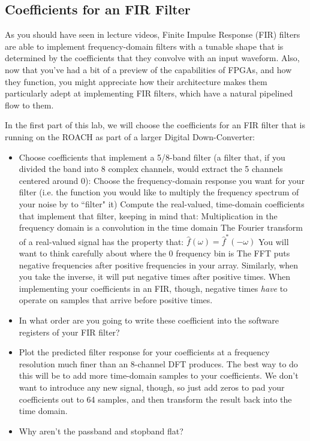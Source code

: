 \documentclass[11pt]{article}
\begin{document}
\subsection{Coefficients for an FIR Filter} \label{fir_filter}

As you should have seen in lecture videos, Finite Impulse Response (FIR) filters are
able to implement frequency-domain filters with a tunable shape that is determined
by the coefficients that they convolve with an input waveform.
Also, now that you've had a bit of a preview of the capabilities of FPGAs, and how they function,
you might appreciate how their architecture makes them particularly adept at implementing
FIR filters, which have a natural pipelined flow to them.

In the first part of this lab, we will choose the coefficients for an FIR filter that is running
on the ROACH as part of a larger Digital Down-Converter:
\begin{itemize}[noitemsep,nolistsep]
\item Choose coefficients that implement a 5/8-band filter (a filter that, if you divided the band into 8 complex
channels, would extract the 5 channels centered around 0):
\subitem Choose the frequency-domain response you want for your filter (i.e. the function you would like to multiply
the frequency spectrum of your noise by to ``filter" it)
\subitem Compute the real-valued, time-domain coefficients that implement that filter, keeping in mind that: 
\subsubitem Multiplication in the frequency domain is a convolution in the time domain
\subsubitem The Fourier transform of a real-valued signal has the property that:
$\hat f(\omega) = \hat f^*(-\omega)$
\subsubitem You will want to think carefully about where the 0 frequency bin is
\subsubitem The FFT puts negative frequencies after positive frequencies in your array.  Similarly, when you take the inverse, it will put negative times after positive times.  When implementing your coefficients in an FIR, though, negative times {\it have} to operate on samples that arrive before positive times.
\item In what order are you going to write these coefficient into the software registers of your FIR filter?
\item Plot the predicted filter response for your coefficients at a frequency resolution much finer than an 8-channel
DFT produces.  The best way to do this will be to add more time-domain samples to your coefficients.  We don't want to introduce any new signal, though, so just add zeros to pad your coefficients out to 64 samples, and then transform the result back into the time domain.  
\item Why aren't the passband and stopband flat?
\end{itemize}
\end{document}
